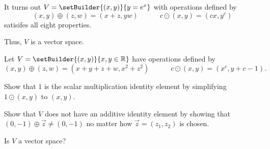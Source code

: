\begin{remark}
  It turns out \(V=\setBuilder{(x,y)}{y=e^x}\) with operations defined by
  \[
    (x,y)\oplus (z,w)=(x+z,yw)
      \hspace{3em}
    c\odot (x,y)=(cx,y^c)
  \]
  satisifes all eight properties.

  \vectorSpaceProperties

  Thus, \(V\) is a vector space.
\end{remark}





\begin{activity}{15}
  Let \(V=\setBuilder{(x,y)}{x,y\in\IR}\) have operations defined by
  \[
    (x,y)\oplus (z,w)=(x+y+z+w,x^2+z^2)
      \hspace{3em}
    c\odot (x,y)=(x^c,y+c-1)
  .\]

  \begin{subactivity}
    Show that \(1\) is the scalar multiplication identity element
	by simplifying \(1\odot(x,y)\) to \((x,y)\).
  \end{subactivity}

  \begin{subactivity}
    Show that \(V\) does not have an additive identity element by showing that 
	\((0,-1)\oplus\vec z\not=(0,-1)\) no matter how
    \(\vec z=(z_1,z_2)\) is chosen.
  \end{subactivity}

  \begin{subactivity}
    Is \(V\) a vector space?
  \end{subactivity}
\end{activity}

